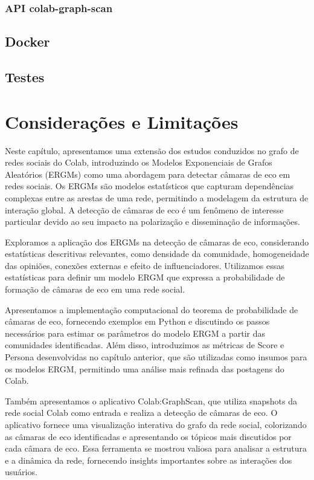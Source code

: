 \subsubsection{API colab-graph-scan}
\lipsum[5]

\subsection{Docker}
\lipsum[5]

\subsection{Testes}
\lipsum[5]

\section{Considerações e Limitações}
Neste capítulo, apresentamos uma extensão dos estudos conduzidos no grafo de redes sociais do Colab, introduzindo os Modelos Exponenciais de Grafos Aleatórios (ERGMs) como uma abordagem para detectar câmaras de eco em redes sociais. Os ERGMs são modelos estatísticos que capturam dependências complexas entre as arestas de uma rede, permitindo a modelagem da estrutura de interação global. A detecção de câmaras de eco é um fenômeno de interesse particular devido ao seu impacto na polarização e disseminação de informações.

Exploramos a aplicação dos ERGMs na detecção de câmaras de eco, considerando estatísticas descritivas relevantes, como densidade da comunidade, homogeneidade das opiniões, conexões externas e efeito de influenciadores. Utilizamos essas estatísticas para definir um modelo ERGM que expressa a probabilidade de formação de câmaras de eco em uma rede social.

Apresentamos a implementação computacional do teorema de probabilidade de câmaras de eco, fornecendo exemplos em Python e discutindo os passos necessários para estimar os parâmetros do modelo ERGM a partir das comunidades identificadas. Além disso, introduzimos as métricas de Score e Persona desenvolvidas no capítulo anterior, que são utilizadas como insumos para os modelos ERGM, permitindo uma análise mais refinada das postagens do Colab.

Também apresentamos o aplicativo Colab:GraphScan, que utiliza snapshots da rede social Colab como entrada e realiza a detecção de câmaras de eco. O aplicativo fornece uma visualização interativa do grafo da rede social, colorizando as câmaras de eco identificadas e apresentando os tópicos mais discutidos por cada câmara de eco. Essa ferramenta se mostrou valiosa para analisar a estrutura e a dinâmica da rede, fornecendo insights importantes sobre as interações dos usuários.

